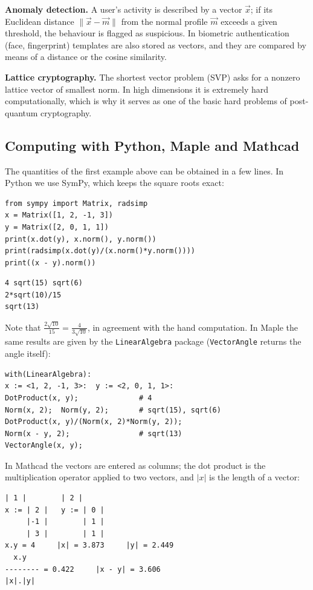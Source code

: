 \textbf{Anomaly detection.} A user’s activity is described by a vector $\vec x$;
if its Euclidean distance $\|\vec x-\vec m\|$ from the normal profile $\vec m$
exceeds a given threshold, the behaviour is flagged as suspicious. In biometric
authentication (face, fingerprint) templates are also stored as vectors, and
they are compared by means of a distance or the cosine similarity.

\textbf{Lattice cryptography.} The shortest vector problem (SVP) asks for a
nonzero lattice vector of smallest norm. In high dimensions it is extremely hard
computationally, which is why it serves as one of the basic hard problems of
post-quantum cryptography.

\subsection{Computing with Python, Maple and Mathcad}

The quantities of the first example above can be obtained in a few lines. In
Python we use SymPy, which keeps the square roots exact:
\begin{Verbatim}[fontsize=\footnotesize,frame=single,label={\small Python}]
from sympy import Matrix, radsimp
x = Matrix([1, 2, -1, 3])
y = Matrix([2, 0, 1, 1])
print(x.dot(y), x.norm(), y.norm())
print(radsimp(x.dot(y)/(x.norm()*y.norm())))
print((x - y).norm())
\end{Verbatim}
\begin{Verbatim}[fontsize=\footnotesize,frame=single,label={\small Output}]
4 sqrt(15) sqrt(6)
2*sqrt(10)/15
sqrt(13)
\end{Verbatim}
Note that $\frac{2\sqrt{10}}{15}=\frac{4}{3\sqrt{10}}$, in agreement with the hand computation.
In Maple the same results are given by the \texttt{LinearAlgebra} package
(\texttt{VectorAngle} returns the angle itself):
\begin{Verbatim}[fontsize=\footnotesize,frame=single,label={\small Maple}]
with(LinearAlgebra):
x := <1, 2, -1, 3>:  y := <2, 0, 1, 1>:
DotProduct(x, y);              # 4
Norm(x, 2);  Norm(y, 2);       # sqrt(15), sqrt(6)
DotProduct(x, y)/(Norm(x, 2)*Norm(y, 2));
Norm(x - y, 2);                # sqrt(13)
VectorAngle(x, y);
\end{Verbatim}
In Mathcad the vectors are entered as columns; the dot product is the
multiplication operator applied to two vectors, and $|x|$ is the length of a vector:
\begin{Verbatim}[fontsize=\footnotesize,frame=single,label={\small Mathcad}]
     | 1 |        | 2 |
x := | 2 |   y := | 0 |
     |-1 |        | 1 |
     | 3 |        | 1 |
x.y = 4     |x| = 3.873     |y| = 2.449
  x.y
-------- = 0.422     |x - y| = 3.606
|x|.|y|
\end{Verbatim}

